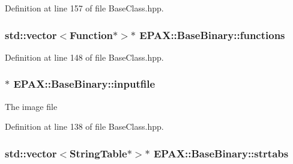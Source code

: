 \-Definition at line 157 of file \-Base\-Class.\-hpp.

\hypertarget{class_e_p_a_x_1_1_base_binary_aa26b782267daf58809b05047ff677a3e}{
\subsubsection[{functions}]{\setlength{\rightskip}{0pt plus 5cm}std\-::vector$<${\bf \-Function}$\ast$$>$$\ast$ {\bf \-E\-P\-A\-X\-::\-Base\-Binary\-::functions}}}\label{class_e_p_a_x_1_1_base_binary_aa26b782267daf58809b05047ff677a3e}


\-Definition at line 148 of file \-Base\-Class.\-hpp.

\hypertarget{class_e_p_a_x_1_1_base_binary_a9e75692a1d1b71186a49dd77d8b74a65}{
\subsubsection[{inputfile}]{$\ast$ {\bf \-E\-P\-A\-X\-::\-Base\-Binary\-::inputfile}}}\label{class_e_p_a_x_1_1_base_binary_a9e75692a1d1b71186a49dd77d8b74a65}
\-The image file 

\-Definition at line 138 of file \-Base\-Class.\-hpp.

\hypertarget{class_e_p_a_x_1_1_base_binary_a48e7fd1954b46f6bf7885dd70ae0ac78}{
\subsubsection[{strtabs}]{\setlength{\rightskip}{0pt plus 5cm}std\-::vector$<${\bf \-String\-Table}$\ast$$>$$\ast$ {\bf \-E\-P\-A\-X\-::\-Base\-Binary\-::strtabs}}}\label{class_e_p_a_x_1_1_base_binary_a48e7fd1954b46f6bf7885dd70ae0ac78}


